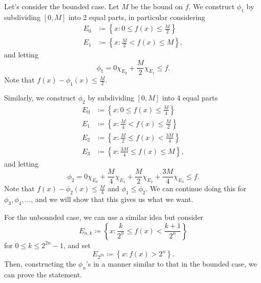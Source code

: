 \documentclass[notoc,notitlepage]{tufte-book}
\begin{document}
\begin{strategy}
  Let's consider the bounded case.
  Let $M$ be the bound on $f$.
  We construct $\phi_1$ by subdividing $[0, M]$ into 2 equal parts,
  in particular considering
  \begin{align*}
    E_0 &\coloneqq \left\{ x : 0 \leq f(x) \leq \frac{M}{2} \right\} \\
    E_1 &\coloneqq \left\{ x : \frac{M}{2} < f(x) \leq M \right\},
  \end{align*}
  and letting
  \begin{equation*}
    \phi_1 = 0 \chi_{E_0} + \frac{M}{2} \chi_{E_1} \leq f.
  \end{equation*}
  Note that $f(x) - \phi_1(x) \leq \frac{M}{2}$.

  Similarly, we construct $\phi_2$ by subdividing $[0, M]$ into 4 equal parts
  \begin{align*}
    E_0 &\coloneqq \left\{ x : 0 \leq f(x) \leq \frac{M}{4} \right\} \\
    E_1 &\coloneqq \left\{ x : \frac{M}{4} < f(x) \leq \frac{M}{2} \right\} \\
    E_2 &\coloneqq \left\{ x : \frac{M}{2} \leq f(x) < \frac{3M}{4} \right\} \\
    E_3 &\coloneqq \left\{ x : \frac{3M}{4} \leq f(x) \leq M \right\},
  \end{align*}
  and letting
  \begin{equation*}
    \phi_2 = 0 \chi_{E_0} + \frac{M}{4} \chi_{E_1}
          + \frac{M}{2} \chi_{E_2} + \frac{3M}{4} \chi_{E_3} \leq f.
  \end{equation*}
  Note that $f(x) - \phi_2(x) \leq \frac{M}{4}$ and $\phi_1 \leq \phi_2$.
  We can continue doing this for $\phi_3, \phi_4, \ldots$,
  and we will show that this gives us what we want.

  For the unbounded case, we can use a similar idea but consider
  \begin{equation*}
    E_{n, k} \coloneqq \left\{ x : \frac{k}{2^n} \leq f(x) < \frac{k+1}{2^n} \right\}
  \end{equation*}
  for $0 \leq k \leq 2^{2n} - 1$,
  and set
  \begin{equation*}
    E_{2^{2n}} \coloneqq \left\{ x : f(x) > 2^n \right\}.
  \end{equation*}
  Then, constructing the $\phi_n$'s in a manner similar to that
  in the bounded case, we can prove the statement.
\end{strategy}

\end{document}
